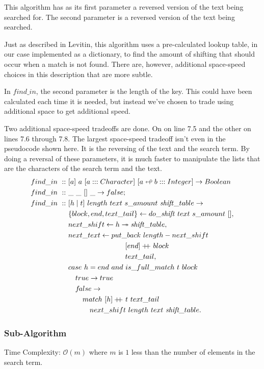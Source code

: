 \documentclass[a4paper,10pt]{book}
\newcommand\doubleplus{+\kern-1.3ex+\kern0.8ex}
\newcommand{\false}{f\kern-0.25ex{alse}}
\begin{document}
This algorithm has as its first parameter a reversed version of the text being searched for. The second parameter is a reversed version of the text being searched.

Just as described in Levitin, this algorithm uses a pre-calculated lookup table, in our case implemented as a dictionary, to find the amount of shifting that should occur when a match is not found. There are, however, additional space-speed choices in this description that are more subtle. 

In $find\_in$, the second parameter is the length of the key. This could have been calculated each time it is needed, but instead we've chosen to trade using additional space to get additional speed.

Two additional space-speed tradeoffs are done. On on line 7.5 and the other on lines 7.6 through 7.8. The largest space-speed tradeoff isn't even in the pseudocode shown here. It is the reversing of the text and the search term. By doing a reversal of these parameters, it is much faster to manipulate the lists that are the characters of the search term and the text.
\begin{align*}
find\_in\ ::\ &[a]\ a\ [a:::Character]\ [a\looparrowleft b:::Integer]\rightarrow Boolean\\
find\_in\ ::\ &\_\ \_\ []\ \_\rightarrow false;\\
find\_in\ ::\ & [h\mid t]\ length\ text\ s\_amount\  \text{\textit{shift}}\_table\rightarrow\\
	&\{block,end, text\_tail\}\leftarrow do\_\text{\textit{shift}}\ text\ 
s\_amount\ [],\\
	&next\_shift\leftarrow h\twoheadrightarrow\text{\textit{shift}}\_table,\\
	&next\_text\leftarrow put\_back\ length-next\_shift\\
	&\qquad\qquad\qquad\qquad [end]\doubleplus block\\
	&\qquad\qquad\qquad\qquad text\_tail,\\
	&case\ h = end\ and\ is\_full\_match\ t\ block\\\
	&\quad true\rightarrow true\\
	&\quad\false\rightarrow\\
	&\qquad match\ [h]\doubleplus t\ text\_tail\\
	&\qquad\quad next\_shift\ length\ text\ {\textit{shift}}\_table.
\end{align*}
\subsubsection{Sub-Algorithm}Time Complexity: $\mathcal{O}(m)$ where $m$ is $1$ less than the number of elements in the search term.
\end{document}
